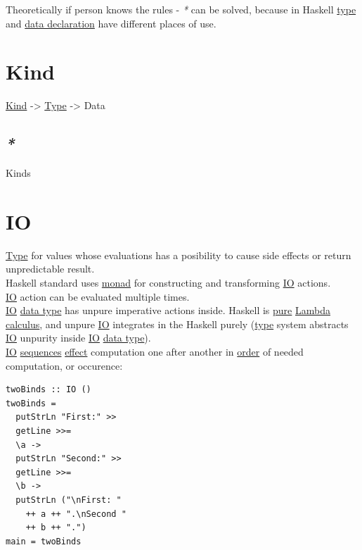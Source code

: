 \documentclass[a4paper,14pt,oneside]{book}
\begin{document}
Theoretically if person knows the rules - \emph{*} can be solved, because in Haskell \hyperref[org258d25a]{type} and \hyperref[orgee46a1b]{data declaration} have different places of use.\\

\section{\label{orge0ef26c}Kind}
\label{sec:org69f03ed}
\hyperref[orge0ef26c]{Kind} -> \hyperref[org258d25a]{Type} -> Data\\

\subsection{\emph{*}}
\label{sec:orgc1cb58b}

\label{orgb917ceb}Kinds\\

\section{\label{org8ee277f}IO}
\label{sec:orgdfb034f}
\hyperref[org258d25a]{Type} for values whose evaluations has a posibility to cause side effects or return unpredictable result.\\
Haskell standard uses \hyperref[org9ad723a]{monad} for constructing and transforming \hyperref[org8ee277f]{IO} actions.\\
\hyperref[org8ee277f]{IO} action can be evaluated multiple times.\\

\hyperref[org8ee277f]{IO} \hyperref[orga639c70]{data type} has unpure imperative actions inside. Haskell is \hyperref[org654e12d]{pure} \hyperref[org293c423]{Lambda calculus}, and unpure \hyperref[org8ee277f]{IO} integrates in the Haskell purely (\hyperref[org258d25a]{type} system abstracts \hyperref[org8ee277f]{IO} unpurity inside \hyperref[org8ee277f]{IO} \hyperref[orga639c70]{data type}).\\

\hyperref[org8ee277f]{IO} \hyperref[org10827f0]{sequences} \hyperref[org1077d64]{effect} computation one after another in \hyperref[org23236a7]{order} of needed computation, or occurence:\\

\begin{verbatim}
twoBinds :: IO ()
twoBinds =
  putStrLn "First:" >>
  getLine >>=
  \a ->
  putStrLn "Second:" >>
  getLine >>=
  \b ->
  putStrLn ("\nFirst: "
    ++ a ++ ".\nSecond "
    ++ b ++ ".")
main = twoBinds
\end{verbatim}
\end{document}
